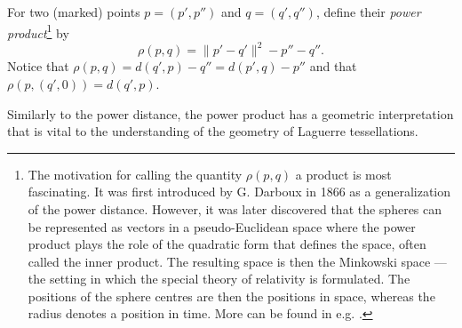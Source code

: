 \begin{definition}
	For two (marked) points $p=(p',p'')$ and $q=(q',q'')$, define their \textit{power product}\footnote{ The motivation for calling the quantity $\rho(p,q)$ a product is most fascinating. It was first introduced by G. Darboux in 1866 as a generalization of the power distance. However, it was later discovered that the spheres can be represented as vectors in a pseudo-Euclidean space where the power product plays the role of the quadratic form that defines the space, often called the inner product. The resulting space is then the Minkowski space --- the setting in which the special theory of relativity is formulated. The positions of the sphere centres are then the positions in space, whereas the radius denotes a position in time. More can be found in e.g. \cite{Kocik2007}.} by 
$$\rho(p,q) = \|p'-q'\|^2 - p'' - q''.$$
Notice that $\rho(p,q) = d(q',p) - q'' = d(p',q) - p''$ and that $\rho(p,(q',0)) = d(q',p)$.
\end{definition}

Similarly to the power distance, the power product has a geometric interpretation that is vital to the understanding of the geometry of Laguerre tessellations.








